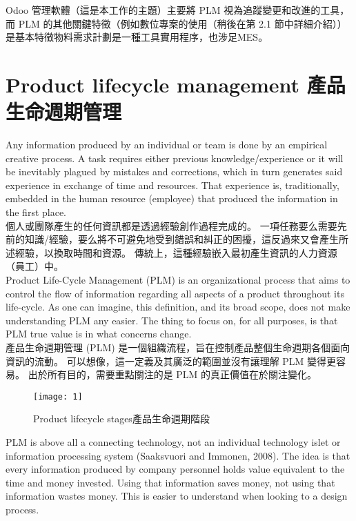 \fontsize{14pt}{5pt}\sectionef
 {Odoo 管理軟體（這是本工作的主題）主要將 PLM 視為追蹤變更和改進的工具，而 PLM 的其他關鍵特徵（例如數位專案的使用（稍後在第 2.1 節中詳細介紹））是基本特徵物料需求計劃是一種工具實用程序，也涉足MES。}\\[15pt]
\section{Product lifecycle management 產品生命週期管理}
\fontsize{14pt}{2.5pt}\sectionef 
{Any information produced by an individual or team is done by an empirical creative 
process. A task requires either previous knowledge/experience or it will be inevitably plagued 
by mistakes and corrections, which in turn generates said experience in exchange of time and 
resources. That experience is, traditionally, embedded in the human resource (employee) that 
produced the information in the first place.}\\[1pt]

\fontsize{14pt}{5pt}\sectionef
 {個人或團隊產生的任何資訊都是透過經驗創作過程完成的。 一項任務要么需要先前的知識/經驗，要么將不可避免地受到錯誤和糾正的困擾，這反過來又會產生所述經驗，以換取時間和資源。 傳統上，這種經驗嵌入最初產生資訊的人力資源（員工）中。}\\[15pt]
\newpage
\fontsize{14pt}{2.5pt}\sectionef 
{Product Life-Cycle Management (PLM) is an organizational process that aims to control 
the flow of information regarding all aspects of a product throughout its life-cycle. As one 
can imagine, this definition, and its broad scope, does not make understanding PLM any 
easier. The thing to focus on, for all purposes, is that PLM true value is in what concerns 
change.}\\[1pt]

\fontsize{14pt}{5pt}\sectionef
 {產品生命週期管理 (PLM) 是一個組織流程，旨在控制產品整個生命週期各個面向資訊的流動。 可以想像，這一定義及其廣泛的範圍並沒有讓理解 PLM 變得更容易。 出於所有目的，需要重點關注的是 PLM 的真正價值在於關注變化。}\\[15pt]

\begin{figure}[hbt!]
\begin{center}
\texttt{[image: 1]}
\caption{\Large Product lifecycle stages產品生命週期階段}\label{fig.1}
\end{center}
\end{figure}
\newpage
\fontsize{14pt}{2.5pt}\sectionef 
{PLM is above all a connecting technology, not an individual technology islet or information processing system (Saaksvuori and Immonen, 2008). The idea is that every information produced by company personnel holds value equivalent to the time and money invested. Using that information saves money, not using that information wastes money. This is easier to understand when looking to a design process.}\\[1pt]

